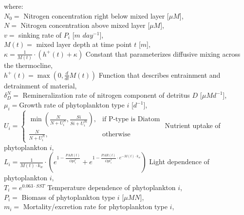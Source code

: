 \documentclass[11pt,letterpaper,english]{article}
\begin{document}
where:\\
\mbox{} \hspace{.5cm} $N_0=$ Nitrogen concentration right below mixed layer [$\mu M$],\\
\mbox{} \hspace{.5cm} $N=$ Nitrogen concentration above mixed layer [$\mu M$],\\
\mbox{} \hspace{.5cm} $v=$ sinking rate of $P_i$ [$m$ $day^{-1}$],\\
\mbox{} \hspace{.5cm} $M(t)=$ mixed layer depth at time point $t$ [$m$],\\
\mbox{} \hspace{.5cm} $\kappa = \frac{1}{M(t)} \cdot \left(h^{+}(t) + \kappa\right)$ Constant that parameterizes diffusive mixing across the thermocline, \\
\mbox{} \hspace{.5cm} $h^{+}(t) = \max\left(0, \frac{d}{d t} M(t)\right)$ Function that describes entrainment and detrainment of material,\\
\mbox{} \hspace{.5cm} $\delta^N_D=$ Remineralization rate of nitrogen component of detritus $D$ [$\mu M d^{-1}$],\\
\mbox{} \hspace{.5cm} $\mu_i=$Growth rate of phytoplankton type $i$ [$d^{-1}$],\\


\mbox{} \hspace{.5cm} $U_i=\begin{cases}\min\left(\frac{N}{N + U^{N}_i}, \frac{Si}{Si + U^{Si}_i}\right),& \text{if P-type is Diatom}\\\frac{N}{N + U^{N}_i}, & \text{otherwise}\end{cases}$ Nutrient uptake of phytoplankton $i$,\\

\mbox{} \hspace{.5cm} $L_i=\frac{1}{M(t) \cdot k_{w}} \cdot \left(e^{1 - \frac{PAR(t)}{Opt^{I}_i}} + e^{1 - \frac{PAR(t)}{Opt^{I}_i} \cdot e^{- M(t) \cdot k_{w}}}\right)$ Light dependence of  phytoplankton $i$,\\
\mbox{} \hspace{.5cm} $T_i= e^{0.063 \cdot SST}$ Temperature dependence of phytoplankton $i$,\\

\mbox{} \hspace{.5cm} $P_i=$ Biomass of phytoplankton type $i$ [$\mu M N$],\\
\mbox{} \hspace{.5cm} $m_i=$ Mortality/excretion rate for phytoplankton type $i$,\\
\end{document}

